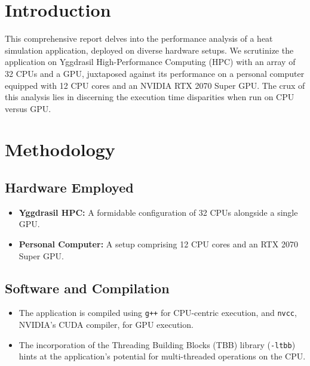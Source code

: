 \hypertarget{introduction}{%
\section{Introduction}\label{introduction}}

This comprehensive report delves into the performance analysis of a heat
simulation application, deployed on diverse hardware setups. We
scrutinize the application on Yggdrasil High-Performance Computing (HPC)
with an array of 32 CPUs and a GPU, juxtaposed against its performance
on a personal computer equipped with 12 CPU cores and an NVIDIA RTX 2070
Super GPU. The crux of this analysis lies in discerning the execution
time disparities when run on CPU versus GPU.

\hypertarget{methodology}{%
\section{Methodology}\label{methodology}}

\hypertarget{hardware-employed}{%
\subsection{Hardware Employed}\label{hardware-employed}}

\begin{itemize}
\tightlist
\item
  \textbf{Yggdrasil HPC:} A formidable configuration of 32 CPUs
  alongside a single GPU.
\item
  \textbf{Personal Computer:} A setup comprising 12 CPU cores and an RTX
  2070 Super GPU.
\end{itemize}

\hypertarget{software-and-compilation}{%
\subsection{Software and Compilation}\label{software-and-compilation}}

\begin{itemize}
\tightlist
\item
  The application is compiled using \texttt{g++} for CPU-centric
  execution, and \texttt{nvcc}, NVIDIA's CUDA compiler, for GPU
  execution.
\item
  The incorporation of the Threading Building Blocks (TBB) library
  (\texttt{-ltbb}) hints at the application's potential for
  multi-threaded operations on the CPU.
\end{itemize}

